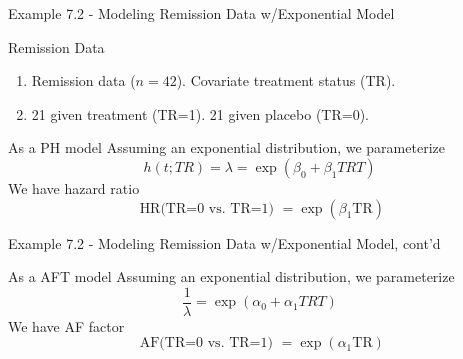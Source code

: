 \documentclass{beamer}
\theoremstyle{definition}
\begin{document}
\begin{frame}{Example 7.2 - Modeling Remission Data w/Exponential Model}
\begin{block}{Remission Data}
\begin{enumerate}[ ]
\item Remission data ($n=42$). Covariate treatment status (TR).
\item 21 given treatment (TR=1). 21 given placebo (TR=0).
\end{enumerate}
\end{block}
\begin{block}{As a PH model}
Assuming an exponential distribution, we parameterize
\[ h(t;TR)= \lambda = \exp(\beta_0 + \beta_1 TRT)
\]
We have hazard ratio
\[
\text{ HR(TR=0 vs. TR=1) } = \exp(\beta_1 \text{TR})
\]
 \end{block}
 \end{frame}

 \begin{frame}{Example 7.2 - Modeling Remission Data w/Exponential Model, cont'd}

\begin{block}{As a AFT model}
Assuming an exponential distribution, we parameterize
\[ \frac{1}{\lambda} = \exp(\alpha_0 + \alpha_1 TRT)
\]
We have AF factor
\[
\text{ AF(TR=0 vs. TR=1) } = \exp(\alpha_1 \text{TR})
\]
 \end{block}
 \end{frame}
 
 
\end{document}
